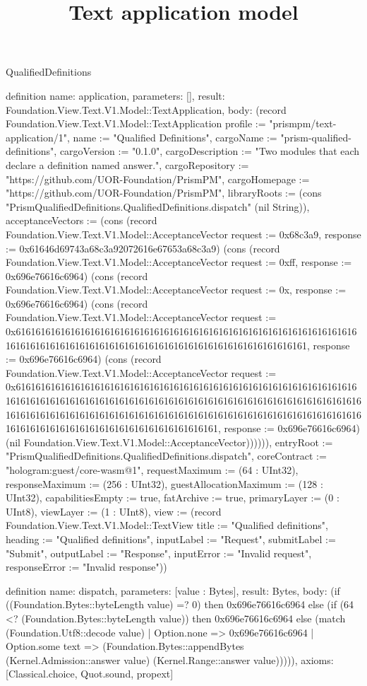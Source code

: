 \begin{lexlean}{QualifiedDefinitions}
\title{Text application model}
\begin{semanticmodule}
definition{
  name: application,
  parameters: [],
  result: Foundation.View.Text.V1.Model::TextApplication,
  body: (record Foundation.View.Text.V1.Model::TextApplication {profile := "prismpm/text-application/1", name := "Qualified Definitions", cargoName := "prism-qualified-definitions", cargoVersion := "0.1.0", cargoDescription := "Two modules that each declare a definition named answer.", cargoRepository := "https://github.com/UOR-Foundation/PrismPM", cargoHomepage := "https://github.com/UOR-Foundation/PrismPM", libraryRoots := (cons "PrismQualifiedDefinitions.QualifiedDefinitions.dispatch" (nil String)), acceptanceVectors := (cons (record Foundation.View.Text.V1.Model::AcceptanceVector {request := 0x68c3a9, response := 0x61646d69743a68c3a92072616e67653a68c3a9}) (cons (record Foundation.View.Text.V1.Model::AcceptanceVector {request := 0xff, response := 0x696e76616c6964}) (cons (record Foundation.View.Text.V1.Model::AcceptanceVector {request := 0x, response := 0x696e76616c6964}) (cons (record Foundation.View.Text.V1.Model::AcceptanceVector {request := 0x6161616161616161616161616161616161616161616161616161616161616161616161616161616161616161616161616161616161616161616161616161616161, response := 0x696e76616c6964}) (cons (record Foundation.View.Text.V1.Model::AcceptanceVector {request := 0x6161616161616161616161616161616161616161616161616161616161616161616161616161616161616161616161616161616161616161616161616161616161616161616161616161616161616161616161616161616161616161616161616161616161616161616161616161616161616161616161616161616161616161, response := 0x696e76616c6964}) (nil Foundation.View.Text.V1.Model::AcceptanceVector)))))), entryRoot := "PrismQualifiedDefinitions.QualifiedDefinitions.dispatch", coreContract := "hologram:guest/core-wasm@1", requestMaximum := (64 : UInt32), responseMaximum := (256 : UInt32), guestAllocationMaximum := (128 : UInt32), capabilitiesEmpty := true, fatArchive := true, primaryLayer := (0 : UInt8), viewLayer := (1 : UInt8), view := (record Foundation.View.Text.V1.Model::TextView {title := "Qualified definitions", heading := "Qualified definitions", inputLabel := "Request", submitLabel := "Submit", outputLabel := "Response", inputError := "Invalid request", responseError := "Invalid response"})})
}

definition{
  name: dispatch,
  parameters: [value : Bytes],
  result: Bytes,
  body: (if ((Foundation.Bytes::byteLength value) =? 0) then 0x696e76616c6964 else (if (64 <? (Foundation.Bytes::byteLength value)) then 0x696e76616c6964 else (match (Foundation.Utf8::decode value)
    | Option.none => 0x696e76616c6964
    | Option.some text => (Foundation.Bytes::appendBytes (Kernel.Admission::answer value) (Kernel.Range::answer value))))),
  axioms: [Classical.choice, Quot.sound, propext]
}
\end{semanticmodule}
\end{lexlean}
